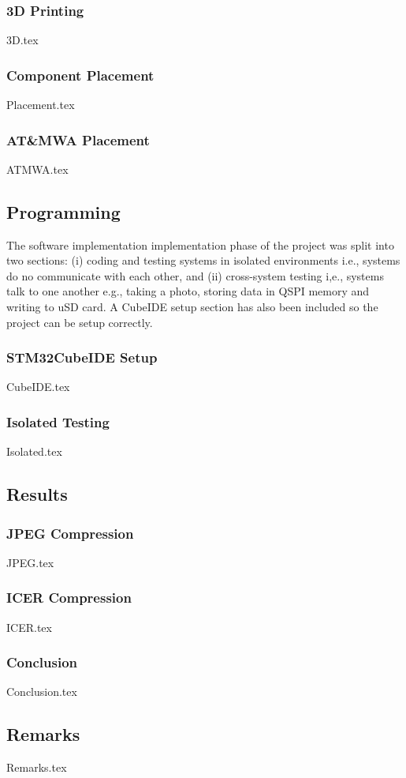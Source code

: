     \subsubsection{3D Printing}
    {3D.tex}

    \subsubsection{Component Placement}
    {Placement.tex}

    \subsubsection{AT\&MWA Placement}
    {ATMWA.tex}

\subsection{Programming}\label{sec:v0.1-coding}

    The software implementation implementation phase of the project was split into two sections: (i) coding and testing systems in isolated environments i.e., systems do no communicate with each other, and (ii) cross-system testing i,e., systems talk to one another e.g., taking a photo, storing data in QSPI memory and writing to uSD card.
    \nl
    A CubeIDE setup section has also been included so the project can be setup correctly.

    \subsubsection{STM32CubeIDE Setup}\label{sec:v0.1-cubeide}
    {CubeIDE.tex}

    \subsubsection{Isolated Testing}
    {Isolated.tex}

\subsection{Results}

    \subsubsection{JPEG Compression}
        {JPEG.tex}
    
    \subsubsection{ICER Compression}
        {ICER.tex}

    \subsubsection{Conclusion}
        {Conclusion.tex}

\subsection{Remarks}
    {Remarks.tex}